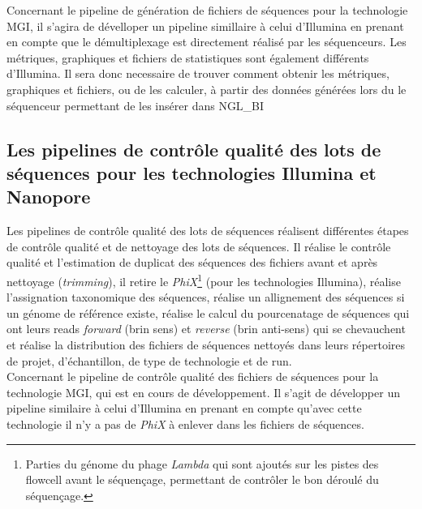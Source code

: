 Concernant le pipeline de génération de fichiers de séquences pour la technologie MGI, il s'agira de dévelloper un pipeline simillaire à celui d'Illumina en prenant en compte que le démultiplexage est directement réalisé par les séquenceurs. Les métriques, graphiques et fichiers de statistiques sont également différents d'Illumina. Il sera donc necessaire de trouver comment obtenir les métriques, graphiques et fichiers, ou de les calculer, à partir des données générées lors du le séquenceur permettant de les insérer dans NGL\_BI

\subsection{Les pipelines de contrôle qualité des lots de séquences pour les technologies Illumina et Nanopore}
Les pipelines de contrôle qualité des lots de séquences réalisent différentes étapes de contrôle qualité et de nettoyage des lots de séquences. Il réalise le contrôle qualité et l'estimation de duplicat des séquences des fichiers avant et après nettoyage (\emph{trimming}), il retire le \emph{PhiX}\footnote{Parties du génome du phage \emph{Lambda} qui sont ajoutés sur les pistes des flowcell avant le séquençage, permettant de contrôler le bon déroulé du séquençage.} (pour les technologies Illumina), réalise l'assignation taxonomique des séquences, réalise un allignement des séquences si un génome de référence existe, réalise le calcul du pourcenatage de séquences qui ont leurs reads \emph{forward} (brin sens) et \emph{reverse} (brin anti-sens) qui se chevauchent et réalise la distribution des fichiers de séquences nettoyés dans leurs répertoires de projet, d'échantillon, de type de technologie et de run.\\

Concernant le pipeline de contrôle qualité des fichiers de séquences pour la technologie MGI, qui est en cours de développement. Il s'agit de développer un pipeline similaire à celui d'Illumina en prenant en compte qu'avec cette technologie il n'y a pas de \emph{PhiX} à enlever dans les fichiers de séquences.
